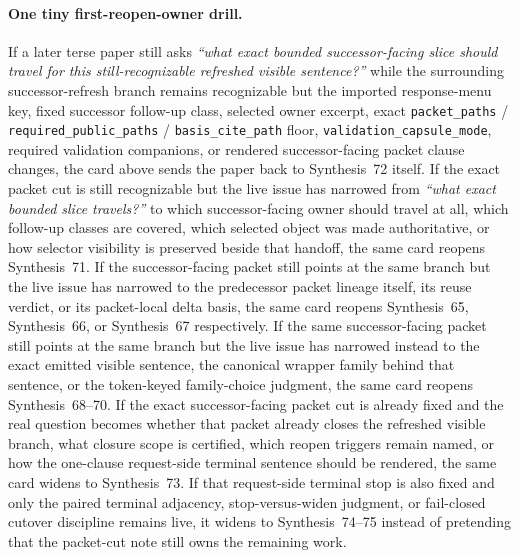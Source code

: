 \documentclass[11pt]{article}
\begin{document}
\paragraph{One tiny first-reopen-owner drill.}
If a later terse paper still asks \emph{``what exact bounded successor-facing slice should travel for this still-recognizable refreshed visible sentence?''} while the surrounding successor-refresh branch remains recognizable but the imported response-menu key, fixed successor follow-up class, selected owner excerpt, exact \nolinkurl{packet_paths} / \nolinkurl{required_public_paths} / \nolinkurl{basis_cite_path} floor, \nolinkurl{validation_capsule_mode}, required validation companions, or rendered successor-facing packet clause changes, the card above sends the paper back to Synthesis~72 itself. If the exact packet cut is still recognizable but the live issue has narrowed from \emph{``what exact bounded slice travels?''} to which successor-facing owner should travel at all, which follow-up classes are covered, which selected object was made authoritative, or how selector visibility is preserved beside that handoff, the same card reopens Synthesis~71. If the successor-facing packet still points at the same branch but the live issue has narrowed to the predecessor packet lineage itself, its reuse verdict, or its packet-local delta basis, the same card reopens Synthesis~65, Synthesis~66, or Synthesis~67 respectively. If the same successor-facing packet still points at the same branch but the live issue has narrowed instead to the exact emitted visible sentence, the canonical wrapper family behind that sentence, or the token-keyed family-choice judgment, the same card reopens Synthesis~68--70. If the exact successor-facing packet cut is already fixed and the real question becomes whether that packet already closes the refreshed visible branch, what closure scope is certified, which reopen triggers remain named, or how the one-clause request-side terminal sentence should be rendered, the same card widens to Synthesis~73. If that request-side terminal stop is also fixed and only the paired terminal adjacency, stop-versus-widen judgment, or fail-closed cutover discipline remains live, it widens to Synthesis~74--75 instead of pretending that the packet-cut note still owns the remaining work.\cite{series:publicrequestresponsepackets,series:publicrequestresponsepacketcarryforward,series:publicrequestresponsepacketdeltas,series:publicrequestresponsepacketrefreshnotices,series:publicrequestresponsepacketrefreshnoticenormalforms,series:publicrequestresponsepacketrefreshnoticeselections,series:publicrequestresponsepacketrefreshresponsemenus,series:publicrequestresponsepacketrefreshresponsepacketclosureverdicts,series:pairedterminalcitationdiscipline,series:pairedterminalcutoverrules}
\end{document}

